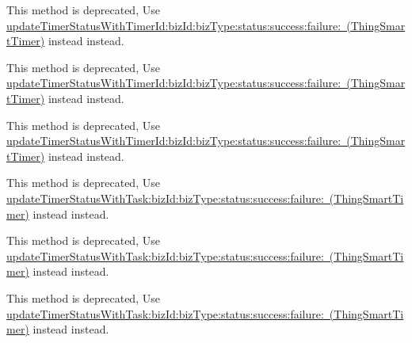 \begin{DoxyRefList}
\label{deprecated__deprecated000099}%
%
This method is deprecated, Use \mbox{\hyperlink{interface_thing_smart_timer_a0bfd1b2d301c2f6086608156df297d3f}{update\+Timer\+Status\+With\+Timer\+Id\+:biz\+Id\+:biz\+Type\+:status\+:success\+:failure\+: (\+Thing\+Smart\+Timer)}} instead instead. 

\label{deprecated__deprecated000126}%
%
This method is deprecated, Use \mbox{\hyperlink{interface_thing_smart_timer_a0bfd1b2d301c2f6086608156df297d3f}{update\+Timer\+Status\+With\+Timer\+Id\+:biz\+Id\+:biz\+Type\+:status\+:success\+:failure\+: (\+Thing\+Smart\+Timer)}} instead instead. 

\label{deprecated__deprecated000108}%
%
This method is deprecated, Use \mbox{\hyperlink{interface_thing_smart_timer_a0bfd1b2d301c2f6086608156df297d3f}{update\+Timer\+Status\+With\+Timer\+Id\+:biz\+Id\+:biz\+Type\+:status\+:success\+:failure\+: (\+Thing\+Smart\+Timer)}} instead instead.  
\item[(Thing\+Deprecated\+Api) Member \mbox{\hyperlink{category_thing_smart_timer_07_thing_deprecated_api_08_a33d8b13917a173cc3cf918c8f6515137}{\mbox{[}Thing\+Smart\+Timer(Thing\+Deprecated\+Api) update\+Timer\+Task\+Status\+With\+Task\+:dev\+Id\+:status\+:success\+:failure\+:\mbox{]}}} ]\label{deprecated__deprecated000107}%
%
This method is deprecated, Use \mbox{\hyperlink{interface_thing_smart_timer_ac6661dc6ea288e68f98cc253ac9eca02}{update\+Timer\+Status\+With\+Task\+:biz\+Id\+:biz\+Type\+:status\+:success\+:failure\+: (\+Thing\+Smart\+Timer)}} instead instead. 

\label{deprecated__deprecated000125}%
%
This method is deprecated, Use \mbox{\hyperlink{interface_thing_smart_timer_ac6661dc6ea288e68f98cc253ac9eca02}{update\+Timer\+Status\+With\+Task\+:biz\+Id\+:biz\+Type\+:status\+:success\+:failure\+: (\+Thing\+Smart\+Timer)}} instead instead. 

\label{deprecated__deprecated000116}%
%
This method is deprecated, Use \mbox{\hyperlink{interface_thing_smart_timer_ac6661dc6ea288e68f98cc253ac9eca02}{update\+Timer\+Status\+With\+Task\+:biz\+Id\+:biz\+Type\+:status\+:success\+:failure\+: (\+Thing\+Smart\+Timer)}} instead instead. 


\end{DoxyRefList}
